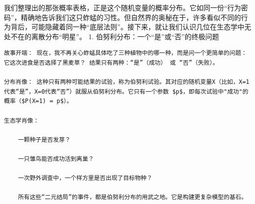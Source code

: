 \documentclass[
]{book}
\begin{document}
我们整理出的那张概率表格，正是这个随机变量的概率分布。它如同一份``行为密码''，精确地告诉我们这只蚱蜢的习性。但自然界的奥秘在于，许多看似不同的行为背后，可能隐藏着同一种``底层法则''。接下来，就让我们认识几位在生态学中无处不在的离散分布``明星''。
1. 伯努利分布：一个``是''或``否''的终极问题

\begin{verbatim}
故事开端： 现在，我不再关心蚱蜢具体吃了三种植物中的哪一种，而是问一个更简单的问题：它这次进食是否选择了黑麦草？ 结果只有两种：“是”（成功） 或 “否”（失败）。

分布肖像： 这种只有两种可能结果的试验，称为伯努利试验。其对应的随机变量X（比如，X=1代表“是”，X=0代表“否”）就服从伯努利分布。它只有一个参数 $p$，即每次试验中"成功"的概率（$P(X=1) = p$）。

生态学肖像：

    一颗种子是否发芽？

    一只雏鸟能否成功活到离巢？

    一次野外调查中，一个样方里是否出现了目标物种？

    所有这些“二元结局”的事件，都是伯努利分布的用武之地。它是构建更复杂模型的基石。
\end{verbatim}
\end{document}

